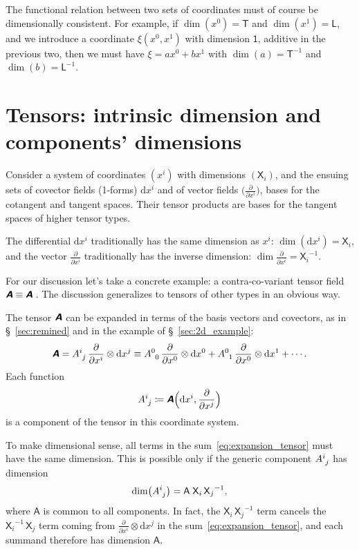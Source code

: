 \documentclass[a4paper,12pt,onecolumn,oneside,article,british]{memoir}
\makeatletter
\newcommand*{\mathte}[1]{\textbf{\textit{\textsf{#1}}}}
\newcommand*{\de}{\partial}%
\newcommand*{\di}{\mathrm{d}}%
\newcommand*{\defd}{\coloneqq}
\newcommand*{\sect}{\S}%
\newcommand*{\q}{}%
\DeclareRobustCommand*{\q}{%
  \mathbin{\mathpalette\bigcdot@{}}%
}
\newcommand*{\bigcdot@scalefactor}{0.7}
\newcommand*{\bigcdot@widthfactor}{1.5}
\newcommand*{\bigcdot@}[2]{%
  \sbox0{$#1\vcenter{}$}%
  \sbox2{$#1\cdot\m@th$}%
  \hbox to \bigcdot@widthfactor\wd2{%
    \hfil
    \raise\ht0\hbox{%
      \scalebox{\bigcdot@scalefactor}{%
        \lower\ht0\hbox{$#1\bullet\m@th$}%
      }%
    }%
    \hfil
  }%
}
\newcommand*{\Un}{\textsf{1}}
\newcommand*{\Le}{\textsf{L}}
\newcommand*{\Ti}{\textsf{T}}
\newcommand*{\Xx}{\textsf{X}}
\newcommand*{\Aa}{\textsf{A}}
\newcommand*{\yA}{\mathte{A}}
\renewcommand*{\i}{\indices}
\newcommand*{\dex}[1][i]{\frac{\de}{\de x^{#1}}}
\newcommand*{\dix}[1][i]{\di x^{#1}}
\makeatother
\begin{document}
The functional relation between two sets of coordinates must of course be
dimensionally consistent. For example, if $\dim(x^{0})=\Ti$ and
$\dim(x^{1})=\Le$, and we introduce a coordinate $\xi(x^{0},x^{1})$ with
dimension $\Un$, additive in the previous two, then we must have
$\xi = a x^{0} + b x^{1}$ with $\dim(a) = \Ti^{-1}$ and
$\dim(b) = \Le^{-1}$.


\section{Tensors: intrinsic dimension and components' dimensions}
\label{sec:tensors}

Consider a system of coordinates $(x^i)$ with dimensions $(\Xx_i)$, and the
ensuing sets of covector fields (1-forms) $\dix$ and of vector fields
$\bigl(\dex\bigr)$, bases for the cotangent and tangent spaces. Their
tensor products are bases for the tangent spaces of higher tensor types.

The differential $\dix$ traditionally has the same dimension as $x^{i}$:
$\dim(\dix) = \Xx_{i}$, and the vector $\dex$ traditionally has the
inverse dimension: $\dim\dex = {\Xx_{i}}^{-1}$. %

For our discussion let's take a concrete example: a contra-co-variant tensor
field $\yA \equiv \yA\i{^{\q}_{\q}}$\,. The discussion generalizes to tensors
of other types in an obvious way.

The tensor $\yA$ can be expanded in terms of the basis vectors and
covectors, as in \sect~\ref{sec:remined} and in the example of
\sect~\ref{sec:2d_example}:
\begin{equation}
  \label{eq:expansion_tensor}
  \yA = A\i{^{i}_{j}}\, \dex\otimes\dix[j]
  \equiv A\i{^{0}_{0}}\,\dex[0]\otimes\dix[0] + 
  A\i{^{0}_{1}}\,\dex[0]\otimes\dix[1] + \dotsb {}.
\end{equation}
Each function
\begin{equation}
  A\i{^{i}_{j}} \defd  \yA\Bigl(\dix, \dex[j]\Bigr)
  \label{eq:components_def}
\end{equation}
is a component of the tensor in this coordinate system.

\medskip

To make dimensional sense, all terms in the sum~\eqref{eq:expansion_tensor}
must have the same dimension. This is possible only if the generic
component $A\i{^{i}_{j}}$ has dimension
\begin{equation}
  \label{eq:dim_component}
  \dim\bigl(A\i{^{i}_{j}}\bigr) = \Aa\;{\Xx_{i}}\,{\Xx_{j}}^{-1},
\end{equation}
where $\Aa$ is common to all components. In fact, the
${\Xx_{i}}\,{\Xx_{j}}^{-1}$ term cancels the ${\Xx_{i}}^{-1}\,{\Xx_{j}}$
term coming from $\dex\otimes\dix[j]$ in the
sum~\eqref{eq:expansion_tensor}, and each summand therefore has dimension
$\Aa$.
\end{document}

